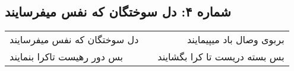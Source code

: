 \begin{center}
\section*{شماره ۴: دل سوختگان که نفس میفرسایند}
\label{sec:004}
\begin{longtable}{l p{0.5cm} r}
دل سوختگان که نفس میفرسایند
&&
بربوی وصال باد میپیمایند
\\
بس دور رهیست تاکرا بنمایند
&&
بس بسته دریست تا کرا بگشایند
\\
\end{longtable}
\end{center}
